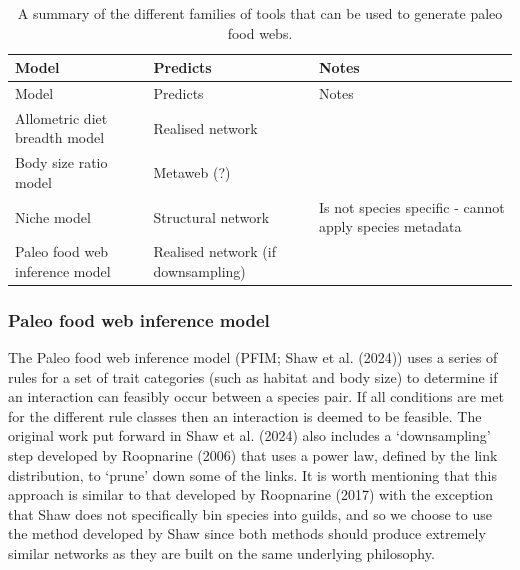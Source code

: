 \documentclass[
]{article}
\begin{document}
\begin{longtable}[]{@{}
  >{\raggedright\arraybackslash}p{}
  >{\raggedright\arraybackslash}p{}
  >{\raggedright\arraybackslash}p{}@{}}
\caption{A summary of the different families of tools that can be used
to generate paleo food webs.}\label{tbl-models}\tabularnewline
\toprule\noalign{}
\begin{minipage}[b]{\linewidth}\raggedright
Model
\end{minipage} & \begin{minipage}[b]{\linewidth}\raggedright
Predicts
\end{minipage} & \begin{minipage}[b]{\linewidth}\raggedright
Notes
\end{minipage} \\
\midrule\noalign{}
\endfirsthead
\toprule\noalign{}
\begin{minipage}[b]{\linewidth}\raggedright
Model
\end{minipage} & \begin{minipage}[b]{\linewidth}\raggedright
Predicts
\end{minipage} & \begin{minipage}[b]{\linewidth}\raggedright
Notes
\end{minipage} \\
\midrule\noalign{}
\endhead
\bottomrule\noalign{}
\endlastfoot
Allometric diet breadth model & Realised network & \\
Body size ratio model & Metaweb (?) & \\
Niche model & Structural network & Is not species specific - cannot
apply species metadata \\
Paleo food web inference model & Realised network (if downsampling) & \\
\end{longtable}

\subsubsection{Paleo food web inference
model}\label{paleo-food-web-inference-model}

The Paleo food web inference model (PFIM; Shaw et al. (2024)) uses a
series of rules for a set of trait categories (such as habitat and body
size) to determine if an interaction can feasibly occur between a
species pair. If all conditions are met for the different rule classes
then an interaction is deemed to be feasible. The original work put
forward in Shaw et al. (2024) also includes a `downsampling' step
developed by Roopnarine (2006) that uses a power law, defined by the
link distribution, to `prune' down some of the links. It is worth
mentioning that this approach is similar to that developed by Roopnarine
(2017) with the exception that Shaw does not specifically bin species
into guilds, and so we choose to use the method developed by Shaw since
both methods should produce extremely similar networks as they are built
on the same underlying philosophy.
\end{document}
